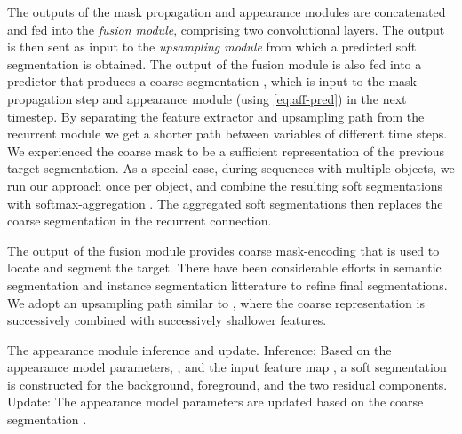 \documentclass[10pt,twocolumn,letterpaper]{article}
\begin{document}
The outputs of the mask propagation and appearance modules are concatenated and fed into the \emph{fusion module}, comprising two convolutional layers. The output is then sent as input to the \emph{upsampling module} from which a predicted soft segmentation  is obtained. The output of the fusion module is also fed into a predictor that produces a coarse segmentation , which is input to the mask propagation step and appearance module (using \eqref{eq:aff-pred}) in the next timestep. By separating the feature extractor and upsampling path from the recurrent module we get a shorter path between variables of different time steps. We experienced the coarse mask to be a sufficient representation of the previous target segmentation. As a special case, during sequences with multiple objects, we run our approach once per object, and combine the resulting soft segmentations with softmax-aggregation \cite{RGMP}. The aggregated soft segmentations then replaces the coarse segmentation  in the recurrent connection.

The output of the fusion module provides coarse mask-encoding that is used to locate and segment the target. There have been considerable efforts in semantic segmentation and instance segmentation litterature to refine final segmentations. We adopt an upsampling path similar to \cite{pinheiro2016learning}, where the coarse representation is successively combined with successively shallower features.

\begin{algorithm}[!t]
  \caption{The appearance module inference and update. Inference: Based on the appearance model parameters, , and the input feature map , a soft segmentation is constructed for the background, foreground, and the two residual components. Update: The appearance model parameters are updated based on the coarse segmentation .}

  \label{alg:appearance-module}
  \DontPrintSemicolon

\end{algorithm}
\end{document}
